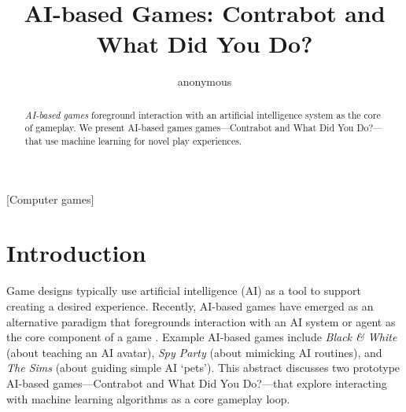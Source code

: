 \documentclass{sig-alternate}
\begin{document}

\title{AI-based Games: Contrabot and What Did You Do?}


\author{
\alignauthor
anonymous
}

\toappear{}

\maketitle
\begin{abstract}
{\it AI-based games} foreground interaction with an artificial intelligence system as the core of gameplay.
We present AI-based games games---{\sc Contrabot} and {\sc What Did You Do?}---that use machine learning for novel play experiences.
\end{abstract}

[Computer games]




\section{Introduction}

\noindent Game designs typically use artificial intelligence (AI) as a tool to support creating a desired experience.
Recently, AI-based games have emerged as an alternative paradigm that foregrounds interaction with an AI system or agent as the core component of a game \cite{eladhari2011:ai-based-games, treanor2015:ai-based-games}.
Example AI-based games include {\it Black \& White} (about teaching an AI avatar), {\it Spy Party} (about mimicking AI routines), and {\it The Sims} (about guiding simple AI `pets').
This abstract discusses two prototype AI-based games---{\sc Contrabot} and {\sc What Did You Do?}---that explore interacting with machine learning algorithms as a core gameplay loop.
\end{document}
